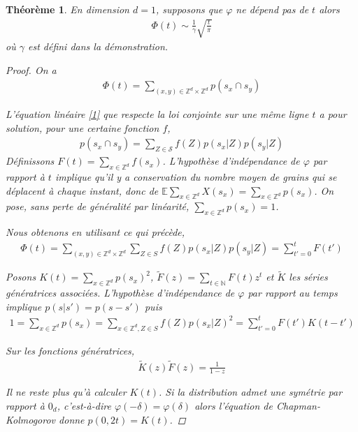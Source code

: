 \documentclass{article}
\newtheorem{theorem}{Théorème}[section]
\theoremstyle{definition}
\begin{document}
\begin{theorem}
	En dimension $d=1$, supposons que $\varphi$ ne dépend pas de $t$
	alors \begin{align*}
		\Phi(t) \sim \frac{1}{\gamma}\sqrt{\frac{t}{\pi}}
	\end{align*}
	où $\gamma$ est défini dans la démonstration.
	\begin{proof}
		On a \begin{align*}
			\Phi(t) = \sum_{(x,y)\in\mathbb{Z}^d\times\mathbb{Z}^d} p(s_x \cap s_y)
		\end{align*}

		L'équation linéaire \eqref{1} que respecte la loi conjointe sur une même ligne $t$ a pour solution, pour une certaine fonction $f$, 
\begin{align*}
	p(s_x\cap s_y) = \sum_{Z\in \mathcal{S}} f(Z) p(s_x|Z)p(s_y|Z)
\end{align*}
Définissons $F(t) = \sum_{x\in\mathbb{Z}^d}f(s_x)$. L'hypothèse d'indépendance de $\varphi$ par rapport à $t$ implique qu'il y a conservation du nombre moyen de grains qui se déplacent à chaque instant, donc de $\mathbb{E}\sum_{x\in\mathbb{Z}^d}X(s_x)=\sum_{x\in\mathbb{Z}^d}p(s_x)$. On pose, sans perte de généralité par linéarité, $\sum_{x\in\mathbb{Z}^d}p(s_x) = 1$.

Nous obtenons en utilisant ce qui précède,
\begin{align*}
	\Phi(t) = \sum_{(x,y)\in\mathbb{Z}^d\times\mathbb{Z}^d}\sum_{Z\in S} f(Z)p(s_x|Z)p(s_y|Z) = \sum_{t'=0}^t F(t')
\end{align*}

Posons $K(t) = \sum_{x\in\mathbb{Z}^d} p(s_x)^2$, $\tilde{F}(z) = \sum_{t\in \mathbb{N}}F(t) z^t$ et $\tilde{K}$ les séries génératrices associées. L'hypothèse d'indépendance de $\varphi$ par rapport au temps implique $p(s|s')=p(s-s')$ puis
\begin{align*}
	1 = \sum_{x\in\mathbb{Z}^d}p(s_x) = \sum_{x\in\mathbb{Z}^d, Z\in S}f(Z)p(s_x|Z)^2 = \sum_{t'=0}^t F(t')K(t-t')
\end{align*}

Sur les fonctions génératrices,
\begin{align*}
	\tilde{K}(z)\tilde{F}(z) = \frac{1}{1-z} \tag{2}
\end{align*}

Il ne reste plus qu'à calculer $K(t)$. Si la distribution admet une symétrie par rapport à $0_d$, c'est-à-dire $\varphi(-\delta) = \varphi(\delta)$ alors l'équation de Chapman-Kolmogorov donne $p(0,2t) = K(t)$. 



\end{proof}
\end{theorem}
\end{document}
